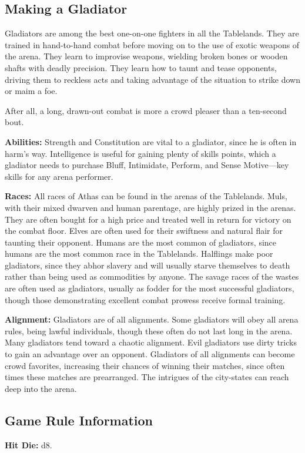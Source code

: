 \subsection{Making a Gladiator}
Gladiators are among the best one-on-one fighters in all the Tablelands. They are trained in hand-to-hand combat before moving on to the use of exotic weapons of the arena. They learn to improvise weapons, wielding broken bones or wooden shafts with deadly precision. They learn how to taunt and tease opponents, driving them to reckless acts and taking advantage of the situation to strike down or maim a foe.

After all, a long, drawn-out combat is more a crowd pleaser than a ten-second bout.

\textbf{Abilities:} Strength and Constitution are vital to a gladiator, since he is often in harm's way. Intelligence is useful for gaining plenty of skills points, which a gladiator needs to purchase Bluff, Intimidate, Perform, and Sense Motive---key skills for any arena performer.

\textbf{Races:} All races of Athas can be found in the arenas of the Tablelands. Muls, with their mixed dwarven and human parentage, are highly prized in the arenas. They are often bought for a high price and treated well in return for victory on the combat floor. Elves are often used for their swiftness and natural flair for taunting their opponent. Humans are the most common of gladiators, since humans are the most common race in the Tablelands. Halflings make poor gladiators, since they abhor slavery and will usually starve themselves to death rather than being used as commodities by anyone. The savage races of the wastes are often used as gladiators, usually as fodder for the most successful gladiators, though those demonstrating excellent combat prowess receive formal training.

\textbf{Alignment:} Gladiators are of all alignments. Some gladiators will obey all arena rules, being lawful individuals, though these often do not last long in the arena. Many gladiators tend toward a chaotic alignment. Evil gladiators use dirty tricks to gain an advantage over an opponent. Gladiators of all alignments can become crowd favorites, increasing their chances of winning their matches, since often times these matches are prearranged. The intrigues of the city-states can reach deep into the arena.

\subsection{Game Rule Information}
\textbf{Hit Die:} d8.

